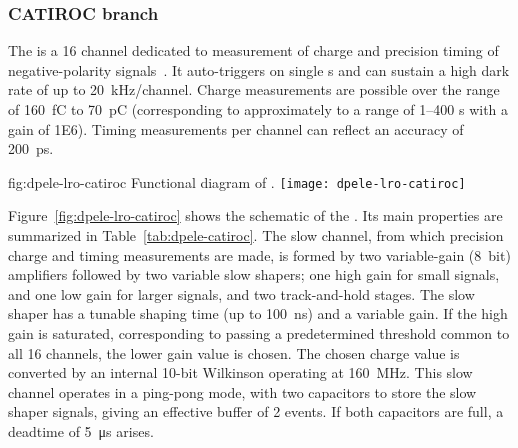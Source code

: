 \subsubsection{CATIROC branch} %

The  is a \num{16} channel  dedicated to measurement of charge and precision timing of negative-polarity  signals~\cite{Blin:2017}. It auto-triggers on single \phel{}s and can sustain a high dark rate of up to \SI{20}{kHz/channel}. Charge measurements are possible over the range of \SI{160}{fC} to \SI{70}{pC} (corresponding to approximately to a range of \numrange{1}{400} \phel{}s with a  gain of \num{1E6}). Timing measurements per channel can %
reflect an accuracy of \SI{200}{ps}.

\begin{dunefigure}{fig:dpele-lro-catiroc}
{Functional diagram of  .}
\texttt{[image: dpele-lro-catiroc]}
\end{dunefigure}

Figure~\ref{fig:dpele-lro-catiroc} shows the schematic of the  . Its main properties are summarized in Table~\ref{tab:dpele-catiroc}. The slow channel, from which precision charge and timing measurements are made, is formed by two variable-gain (\SI{8}{bit}) amplifiers followed by two variable slow shapers; one high gain for small signals, and one low gain for larger signals, and two track-and-hold stages. The slow shaper has a tunable shaping time (up to \SI{100}{ns}) and a variable gain.  If the high gain is saturated, corresponding to passing a predetermined threshold common to all \num{16} channels, the lower gain value is chosen. The chosen charge value is converted by an internal 10-bit Wilkinson  operating at \SI{160}{MHz}.  This slow channel operates in a ping-pong mode, with two capacitors to store the slow shaper signals, giving an effective buffer of 2 events. If both capacitors are full, a deadtime of \SI{5}{\micro\second} arises.

